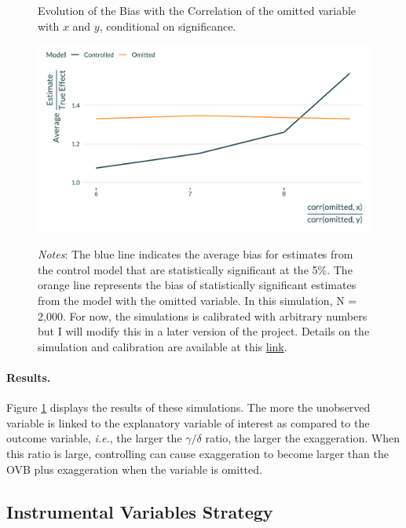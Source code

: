 \documentclass[usletter, 12pt]{article}
\begin{document}
       			 \begin{figure}[!h] 
				\begin{center}
					\caption{Evolution of the Bias with the Correlation of the omitted variable with $x$ and $y$, conditional on significance.}
					\label{graph_controls}
					\includegraphics[width=0.8\linewidth]{images/main_graph_controls_paper.pdf}
		      			\caption*{\footnotesize \textit{Notes}: The blue line indicates the average bias for estimates from the control model that are statistically significant at the 5\%. The orange line represents the bias of statistically significant estimates from the model with the omitted variable. In this simulation, N = 2,000.  For now, the simulations is calibrated with arbitrary numbers but I will modify this in a later version of the project. Details on the simulation and calibration are available at this \href{https://vincentbagilet.github.io/causal_exaggeration/controls.html}{link}.}
				\end{center}
				\vspace{-1cm}
			\end{figure} 
			
			
			\paragraph{Results.}  Figure \ref{graph_controls} displays the results of these simulations. The more the unobserved variable is linked to the explanatory variable of interest as compared to the outcome variable, \textit{i.e.}, the larger the $\gamma/\delta$ ratio, the larger the exaggeration. When this ratio is large, controlling can cause exaggeration to become larger than the OVB plus exaggeration when the variable is omitted.        

        
		
        		\subsection{Instrumental Variables Strategy}\label{sim_IV}
            
\end{document}
